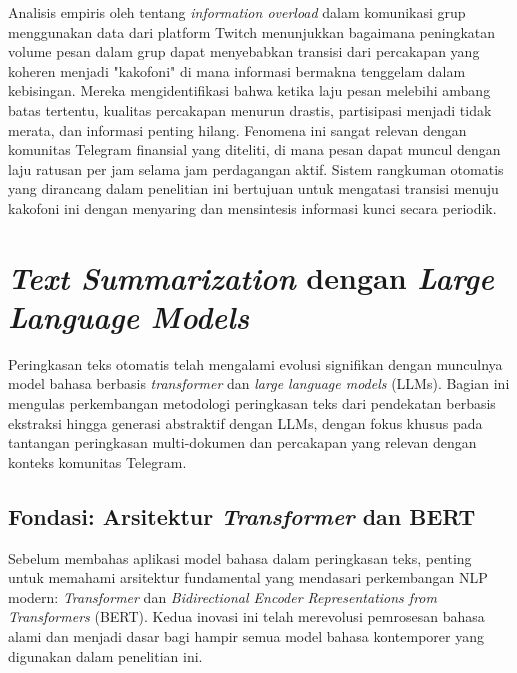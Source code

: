 Analisis empiris oleh \textcite{nematzadeh2019} tentang \textit{information overload} dalam komunikasi grup menggunakan data dari platform Twitch menunjukkan bagaimana peningkatan volume pesan dalam grup dapat menyebabkan transisi dari percakapan yang koheren menjadi "kakofoni" di mana informasi bermakna tenggelam dalam kebisingan. Mereka mengidentifikasi bahwa ketika laju pesan melebihi ambang batas tertentu, kualitas percakapan menurun drastis, partisipasi menjadi tidak merata, dan informasi penting hilang. Fenomena ini sangat relevan dengan komunitas Telegram finansial yang diteliti, di mana pesan dapat muncul dengan laju ratusan per jam selama jam perdagangan aktif. Sistem rangkuman otomatis yang dirancang dalam penelitian ini bertujuan untuk mengatasi transisi menuju kakofoni ini dengan menyaring dan mensintesis informasi kunci secara periodik.


\section{\textit{Text Summarization} dengan \textit{Large Language Models}}
\label{sec:text-summarization}

Peringkasan teks otomatis telah mengalami evolusi signifikan dengan munculnya model bahasa berbasis \textit{transformer} dan \textit{large language models} (LLMs). Bagian ini mengulas perkembangan metodologi peringkasan teks dari pendekatan berbasis ekstraksi hingga generasi abstraktif dengan LLMs, dengan fokus khusus pada tantangan peringkasan multi-dokumen dan percakapan yang relevan dengan konteks komunitas Telegram.

\subsection{Fondasi: Arsitektur \textit{Transformer} dan BERT}

Sebelum membahas aplikasi model bahasa dalam peringkasan teks, penting untuk memahami arsitektur fundamental yang mendasari perkembangan NLP modern: \textit{Transformer} dan \textit{Bidirectional Encoder Representations from Transformers} (BERT). Kedua inovasi ini telah merevolusi pemrosesan bahasa alami dan menjadi dasar bagi hampir semua model bahasa kontemporer yang digunakan dalam penelitian ini.

